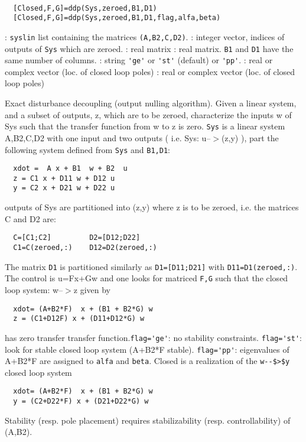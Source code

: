 \begin{mandesc}
   \\ %
\end{mandesc}
\begin{calling_sequence}
\begin{verbatim}
  [Closed,F,G]=ddp(Sys,zeroed,B1,D1)  
  [Closed,F,G]=ddp(Sys,zeroed,B1,D1,flag,alfa,beta)  
\end{verbatim}
\end{calling_sequence}
\begin{parameters}
  \begin{varlist}
    : \verb!syslin! list containing the matrices \verb!(A,B2,C,D2)!.
    : integer vector, indices of outputs of \verb!Sys! which are zeroed.
    : real matrix
    : real matrix. \verb!B1! and \verb!D1! have the same number of columns.
    : string \verb!'ge'! or \verb!'st'! (default) or \verb!'pp'!.
    : real or complex vector (loc. of closed loop poles)
    : real or complex vector (loc. of closed loop poles)
  \end{varlist}
\end{parameters}
\begin{mandescription}
  Exact disturbance decoupling (output nulling algorithm).
  Given a linear system, and a subset of outputs, z, which are to
  be zeroed, characterize the inputs w of Sys such that the 
  transfer function from w to z is zero.
  \verb!Sys! is a linear system {A,B2,C,D2} with one input and two outputs 
  ( i.e.  Sys: u--$>$(z,y) ), part the following system defined from \verb!Sys!
  and \verb!B1,D1!:
\begin{verbatim}
  xdot =  A x + B1  w + B2  u
  z = C1 x + D11 w + D12 u
  y = C2 x + D21 w + D22 u
\end{verbatim}
outputs of Sys are partitioned into (z,y) where z is to be zeroed,
i.e. the matrices C and D2 are:
\begin{verbatim}
  C=[C1;C2]         D2=[D12;D22]
  C1=C(zeroed,:)    D12=D2(zeroed,:)
\end{verbatim}
The matrix \verb!D1! is partitioned similarly as \verb!D1=[D11;D21]!
with \verb!D11=D1(zeroed,:)!.
The control is u=Fx+Gw and one  looks for matriced \verb!F,G! such that the 
closed loop system: w--$>$z given by
\begin{verbatim}
  xdot= (A+B2*F)  x + (B1 + B2*G) w
  z = (C1+D12F) x + (D11+D12*G) w
\end{verbatim}
has zero transfer transfer function.\verb!flag='ge'!: no stability constraints.
\verb!flag='st'!: look for stable closed loop system (A+B2*F stable).
\verb!flag='pp'!: eigenvalues of A+B2*F are assigned to \verb!alfa! and 
\verb!beta!.
Closed is a realization of the \verb!w--$>$y! closed loop system
\begin{verbatim}
  xdot= (A+B2*F)  x + (B1 + B2*G) w
  y = (C2+D22*F) x + (D21+D22*G) w
\end{verbatim}
Stability (resp. pole placement) requires stabilizability 
(resp. controllability) of (A,B2).
\end{mandescription}
